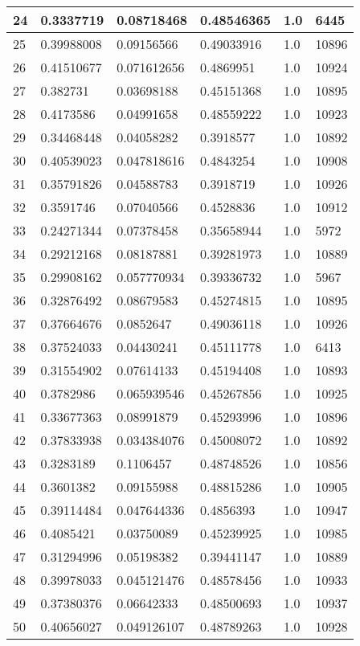 \begin{longtable}{|l|l|l|l|l|l|}
24 & 0.3337719 & 0.08718468 & 0.48546365 & 1.0 & 6445 \\ \hline 
25 & 0.39988008 & 0.09156566 & 0.49033916 & 1.0 & 10896 \\ \hline 
26 & 0.41510677 & 0.071612656 & 0.4869951 & 1.0 & 10924 \\ \hline 
27 & 0.382731 & 0.03698188 & 0.45151368 & 1.0 & 10895 \\ \hline 
28 & 0.4173586 & 0.04991658 & 0.48559222 & 1.0 & 10923 \\ \hline 
29 & 0.34468448 & 0.04058282 & 0.3918577 & 1.0 & 10892 \\ \hline 
30 & 0.40539023 & 0.047818616 & 0.4843254 & 1.0 & 10908 \\ \hline 
31 & 0.35791826 & 0.04588783 & 0.3918719 & 1.0 & 10926 \\ \hline 
32 & 0.3591746 & 0.07040566 & 0.4528836 & 1.0 & 10912 \\ \hline 
33 & 0.24271344 & 0.07378458 & 0.35658944 & 1.0 & 5972 \\ \hline 
34 & 0.29212168 & 0.08187881 & 0.39281973 & 1.0 & 10889 \\ \hline 
35 & 0.29908162 & 0.057770934 & 0.39336732 & 1.0 & 5967 \\ \hline 
36 & 0.32876492 & 0.08679583 & 0.45274815 & 1.0 & 10895 \\ \hline 
37 & 0.37664676 & 0.0852647 & 0.49036118 & 1.0 & 10926 \\ \hline 
38 & 0.37524033 & 0.04430241 & 0.45111778 & 1.0 & 6413 \\ \hline 
39 & 0.31554902 & 0.07614133 & 0.45194408 & 1.0 & 10893 \\ \hline 
40 & 0.3782986 & 0.065939546 & 0.45267856 & 1.0 & 10925 \\ \hline 
41 & 0.33677363 & 0.08991879 & 0.45293996 & 1.0 & 10896 \\ \hline 
42 & 0.37833938 & 0.034384076 & 0.45008072 & 1.0 & 10892 \\ \hline 
43 & 0.3283189 & 0.1106457 & 0.48748526 & 1.0 & 10856 \\ \hline 
44 & 0.3601382 & 0.09155988 & 0.48815286 & 1.0 & 10905 \\ \hline 
45 & 0.39114484 & 0.047644336 & 0.4856393 & 1.0 & 10947 \\ \hline 
46 & 0.4085421 & 0.03750089 & 0.45239925 & 1.0 & 10985 \\ \hline 
47 & 0.31294996 & 0.05198382 & 0.39441147 & 1.0 & 10889 \\ \hline 
48 & 0.39978033 & 0.045121476 & 0.48578456 & 1.0 & 10933 \\ \hline 
49 & 0.37380376 & 0.06642333 & 0.48500693 & 1.0 & 10937 \\ \hline 
50 & 0.40656027 & 0.049126107 & 0.48789263 & 1.0 & 10928 \\ \hline 
\end{longtable}